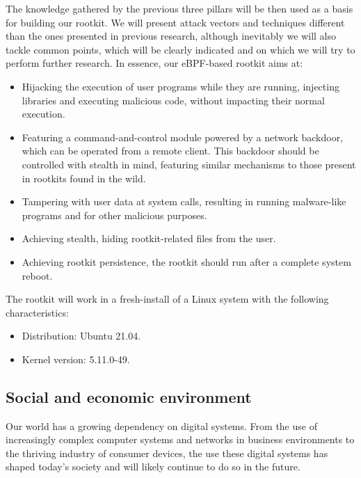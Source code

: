The knowledge gathered by the previous three pillars will be then used as a
basis for building our rootkit. We will present attack vectors and
techniques different than the ones presented in previous research, although
inevitably we will also tackle common points, which will be clearly
indicated and on which we will try to perform further research. In essence,
our eBPF-based rootkit aims at:
\begin{itemize}
\item Hijacking the execution of user programs while they are running, injecting libraries and executing malicious code, without impacting their normal execution.
\item Featuring a command-and-control module powered by a network backdoor, which can be operated from a remote client. This backdoor should be controlled with stealth in mind, featuring similar mechanisms to those present in rootkits found in the wild.
\item Tampering with user data at system calls, resulting in running malware-like programs and for other malicious purposes.
\item Achieving stealth, hiding rootkit-related files from the user.
\item Achieving rootkit persistence, the rootkit should run after a complete system reboot.
\
\end{itemize}

The rootkit will work in a fresh-install of a Linux system with the following characteristics:
\begin{itemize}
\item Distribution: Ubuntu 21.04.
\item Kernel version: 5.11.0-49.
\end{itemize} 


\subsection{Social and economic environment}\label{sec:social_econ_env}

Our world has a growing dependency on digital systems. From the use of
increasingly complex computer systems and networks in business environments
to the thriving industry of consumer devices, the use these digital systems
has shaped today's society and will likely continue to do so in the future. 

